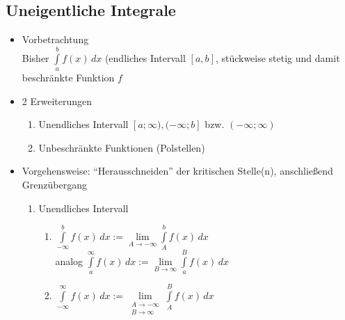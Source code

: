 \documentclass[a4paper]{scrartcl}
\begin{document}
\subsection{Uneigentliche Integrale}
\begin{itemize}
\item Vorbetrachtung\\
Bisher $\int\limits_a^b f(x) \, dx$ (endliches Intervall $[a,b]$, stückweise stetig und damit beschränkte Funktion $f$
\item 2 Erweiterungen
\begin{enumerate}
\item Unendliches Intervall $[a;\infty), (-\infty;b]$ bzw. $(-\infty;\infty)$
\item Unbeschränkte Funktionen (Polstellen)
\end{enumerate}
\item Vorgehensweise: "`Herausschneiden"' der kritischen Stelle(n), anschließend Grenzübergang
\begin{enumerate}
\item Unendliches Intervall
\begin{enumerate}
\item $\int\limits_{-\infty}^b f(x) \, dx := \lim\limits_{A \to - \infty} \int\limits_{A}^{b} f(x) \, dx$\\
analog $\int\limits_a^\infty f(x) \, dx := \lim\limits_{B \to \infty} \int\limits_a^B f(x) \, dx$
\item $\int\limits_{-\infty}^{\infty} f(x) \, dx := \lim\limits_{\begin{array}{c}A\to - \infty \\ B \to \infty \end{array}} \int\limits_A^B f(x) \, dx$
\end{enumerate}
\end{enumerate}

\end{itemize}
\end{document}
